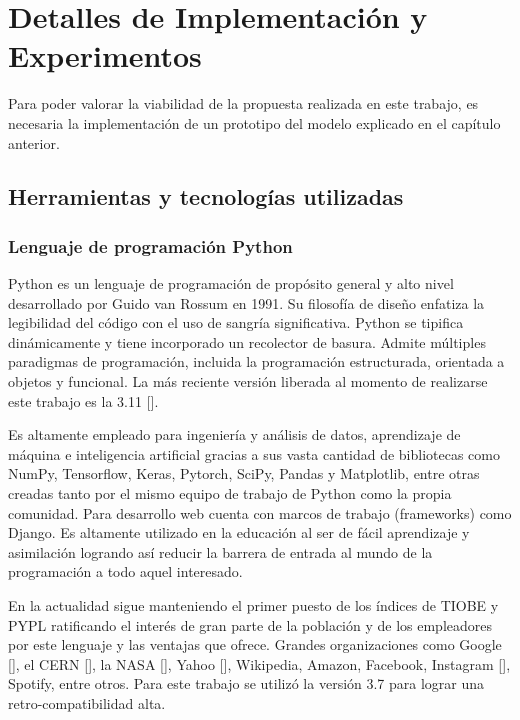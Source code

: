 \chapter{Detalles de Implementación y Experimentos}\label{chapter:implementation}
Para poder valorar la viabilidad de la propuesta realizada en este trabajo, es
necesaria la implementación de un prototipo del modelo explicado en el capítulo
anterior.


\section{Herramientas y tecnologías utilizadas}\label{section:implementation:techs}
\subsection{Lenguaje de programación Python}
Python es un lenguaje de programación de propósito general y alto nivel desarrollado por Guido van Rossum en 1991. Su filosofía de diseño enfatiza la legibilidad del código con el uso de sangría significativa. Python se tipifica dinámicamente y tiene incorporado un recolector de basura. Admite múltiples paradigmas de programación, incluida la programación estructurada, orientada a objetos y funcional. La más reciente  versión liberada al momento de realizarse este trabajo es la 3.11 [\cite{python_executive_summary_2022}].

Es altamente empleado para ingeniería y análisis de datos, aprendizaje de máquina
e inteligencia artificial gracias a sus vasta cantidad de bibliotecas como NumPy, Tensorflow, Keras, Pytorch, SciPy, Pandas y Matplotlib, entre otras creadas tanto por el mismo equipo de trabajo de Python como la propia comunidad. Para desarrollo web cuenta con marcos de trabajo (frameworks) como Django. Es altamente utilizado en la educación al ser de fácil aprendizaje y asimilación logrando así reducir la barrera de entrada al mundo de la programación a todo aquel interesado.

 En la actualidad sigue manteniendo el primer puesto de los índices de TIOBE y PYPL ratificando el interés de gran parte de la población y de los empleadores por este lenguaje y las ventajas que ofrece. Grandes organizaciones como Google [\cite{quotes_about_python_2021}], el CERN [\cite{python_the_holy_grail_of_programming_2014}], la NASA [\cite{python_success_stories_2021}], Yahoo [\cite{organizationsusingpython}], Wikipedia, Amazon, Facebook, Instagram [\cite{meta_for_developers_2018}], Spotify, entre otros.
Para este trabajo se utilizó la versión 3.7 para lograr una retro-compatibilidad
alta.

